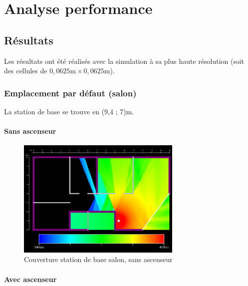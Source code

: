 \chapter{Analyse performance}
\label{chapter-4}




\section{Résultats}

Les résultats ont été réalisés avec la simulation à sa plus haute résolution (soit des cellules de $0,0625\mathrm{m}\times0,0625\mathrm{m}$).

\subsection{Emplacement par défaut (salon)}
La station de base se trouve en (9,4 ; 7)m.

\subsubsection{Sans ascenseur}

\begin{figure}[H]
    \centering
    \includegraphics[width=0.7\textwidth]{latex/images/highres-without-lift.png}
    \caption{Couverture station de base salon, sans ascenseur}
    \label{fig:simu-emplacement-defaut-sansasc}
\end{figure}
\subsubsection{Avec ascenseur}

